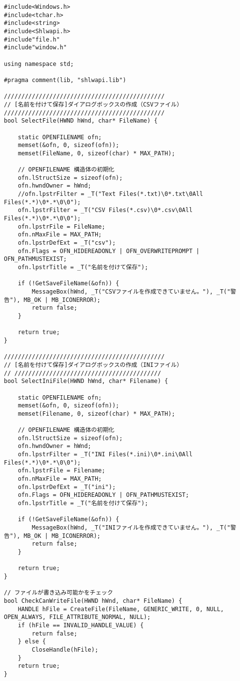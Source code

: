 \begin{lstlisting}[caption=file.cpp]
#include<Windows.h>
#include<tchar.h>
#include<string>
#include<Shlwapi.h>
#include"file.h"
#include"window.h"

using namespace std;

#pragma comment(lib, "shlwapi.lib")

//////////////////////////////////////////////
// [名前を付けて保存]ダイアログボックスの作成（CSVファイル）
//////////////////////////////////////////////
bool SelectFile(HWND hWnd, char* FileName) {

	static OPENFILENAME ofn;
	memset(&ofn, 0, sizeof(ofn));
	memset(FileName, 0, sizeof(char) * MAX_PATH);

	// OPENFILENAME 構造体の初期化
	ofn.lStructSize = sizeof(ofn);
	ofn.hwndOwner = hWnd;
	//ofn.lpstrFilter = _T("Text Files(*.txt)\0*.txt\0All Files(*.*)\0*.*\0\0"); 
	ofn.lpstrFilter = _T("CSV Files(*.csv)\0*.csv\0All Files(*.*)\0*.*\0\0");
	ofn.lpstrFile = FileName;
	ofn.nMaxFile = MAX_PATH;
	ofn.lpstrDefExt = _T("csv");
	ofn.Flags = OFN_HIDEREADONLY | OFN_OVERWRITEPROMPT | OFN_PATHMUSTEXIST;
	ofn.lpstrTitle = _T("名前を付けて保存");

	if (!GetSaveFileName(&ofn)) {
		MessageBox(hWnd, _T("CSVファイルを作成できていません。"), _T("警告"), MB_OK | MB_ICONERROR);
		return false;
	}

	return true;
}

//////////////////////////////////////////////
// [名前を付けて保存]ダイアログボックスの作成（INIファイル）
// //////////////////////////////////////////
bool SelectIniFile(HWND hWnd, char* Filename) {

	static OPENFILENAME ofn;
	memset(&ofn, 0, sizeof(ofn));
	memset(Filename, 0, sizeof(char) * MAX_PATH);

	// OPENFILENAME 構造体の初期化
	ofn.lStructSize = sizeof(ofn);
	ofn.hwndOwner = hWnd;
	ofn.lpstrFilter = _T("INI Files(*.ini)\0*.ini\0All Files(*.*)\0*.*\0\0");
	ofn.lpstrFile = Filename;
	ofn.nMaxFile = MAX_PATH;
	ofn.lpstrDefExt = _T("ini");
	ofn.Flags = OFN_HIDEREADONLY | OFN_PATHMUSTEXIST;
	ofn.lpstrTitle = _T("名前を付けて保存");

	if (!GetSaveFileName(&ofn)) {
		MessageBox(hWnd, _T("INIファイルを作成できていません。"), _T("警告"), MB_OK | MB_ICONERROR);
		return false;
	}

	return true;
}

// ファイルが書き込み可能かをチェック
bool CheckCanWriteFile(HWND hWnd, char* FileName) {
	HANDLE hFile = CreateFile(FileName, GENERIC_WRITE, 0, NULL, OPEN_ALWAYS, FILE_ATTRIBUTE_NORMAL, NULL);
	if (hFile == INVALID_HANDLE_VALUE) {
		return false;
	} else {
		CloseHandle(hFile);
	}
	return true;
}


\end{lstlisting}

